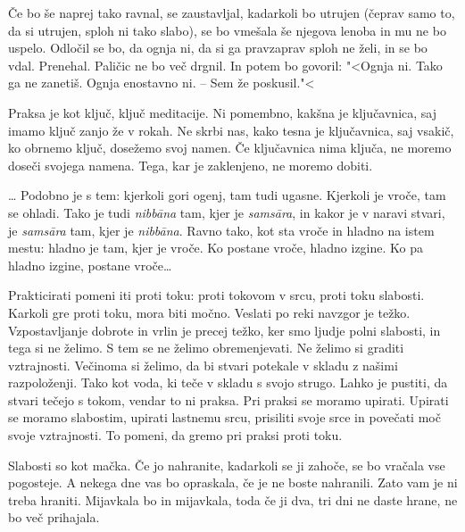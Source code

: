 Če bo še naprej tako ravnal, se zaustavljal, kadarkoli bo utrujen (čeprav samo to, da si utrujen, sploh ni tako slabo), se bo vmešala še njegova lenoba in mu ne bo uspelo. Odločil se bo, da ognja ni, da si ga pravzaprav sploh ne želi, in se bo vdal. Prenehal. Paličic ne bo več drgnil. In potem bo govoril: "<Ognja ni. Tako ga ne zanetiš. Ognja enostavno ni. – Sem že poskusil."<

\vspace{-2.5\baselineskip}
\vspace{-0.5\baselineskip}

Praksa je kot ključ, ključ meditacije. Ni pomembno, kakšna je ključavnica, saj imamo ključ zanjo že v rokah. Ne skrbi nas, kako tesna je ključavnica, saj vsakič, ko obrnemo ključ, dosežemo svoj namen. Če ključavnica nima ključa, ne moremo doseči svojega namena. Tega, kar je zaklenjeno, ne moremo dobiti.

\clearpage


\ldots{} Podobno je s tem: kjerkoli gori ogenj, tam tudi ugasne. Kjerkoli je vroče, tam se ohladi. Tako je tudi \emph{nibbāna} tam, kjer je \emph{samsāra}, in kakor je v naravi stvari, je \emph{samsāra }tam, kjer je \emph{nibbāna}. Ravno tako, kot sta vroče in hladno na istem mestu: hladno je tam, kjer je vroče. Ko postane vroče, hladno izgine. Ko pa hladno izgine, postane vroče\ldots{}


Prakticirati pomeni iti proti toku: proti tokovom v srcu, proti toku slabosti. Karkoli gre proti toku, mora biti močno. Veslati po reki navzgor je težko. Vzpostavljanje dobrote in vrlin je precej težko, ker smo ljudje polni slabosti, in tega si ne želimo. S tem se ne želimo obremenjevati. Ne želimo si graditi vztrajnosti. Večinoma si želimo, da bi stvari potekale v skladu z našimi razpoloženji. Tako kot voda, ki teče v skladu s svojo strugo. Lahko je pustiti, da stvari tečejo s tokom, vendar to ni praksa. Pri praksi se moramo upirati. Upirati se moramo slabostim, upirati lastnemu srcu, prisiliti svoje srce in povečati moč svoje vztrajnosti. To pomeni, da gremo pri praksi proti toku.

\clearpage


Slabosti so kot mačka. Če jo nahranite, kadarkoli se ji zahoče, se bo vračala vse pogosteje. A nekega dne vas bo opraskala, če je ne boste nahranili. Zato vam je ni treba hraniti. Mijavkala bo in mijavkala, toda če ji dva, tri dni ne daste hrane, ne bo več prihajala.

